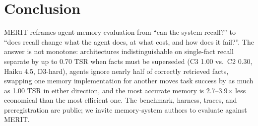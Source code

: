 \documentclass[11pt]{article}
\newcommand{\merit}{\textsc{MERIT}}
\begin{document}
\section{Conclusion}

\merit{} reframes agent-memory evaluation from ``can the system recall?'' to
``does recall change what the agent does, at what cost, and how does it
fail?''. The answer is not monotone: architectures indistinguishable on
single-fact recall separate by up to 0.70 TSR when facts must be
superseded (C3 1.00 vs.\ C2 0.30, Haiku 4.5, D3-hard), agents ignore
nearly half of correctly retrieved
facts, swapping one memory implementation for another moves task success by
as much as 1.00 TSR in either direction, and the most accurate memory is
2.7--3.9$\times$ less economical than the most efficient one. The benchmark,
harness, traces, and preregistration are public; we invite memory-system
authors to evaluate against \merit{}.
\end{document}
